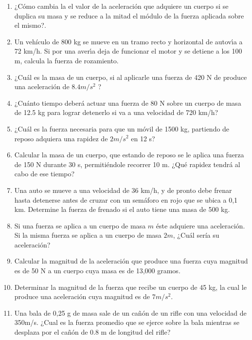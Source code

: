 \documentclass[a5paper,pagesize,10pt,bibtotoc,pointlessnumbers,
normalheadings,DIV=9,fleqn,x11names,table,twoside=false]{scrbook}
\begin{document}
\begin{enumerate}
\item ¿Cómo cambia la el valor de la aceleración que adquiere un cuerpo si se duplica su masa y se reduce a la mitad el módulo de 
la fuerza aplicada sobre el mismo?.

\item Un vehículo de 800 kg se mueve en un tramo recto y horizontal de autovı́a a 72 km/h. Si por una averı́a deja de funcionar 
el motor y se detiene a los 100 m, calcula la fuerza de rozamiento.

\item ¿Cuál es la masa de un cuerpo, si al aplicarle una fuerza de 420 N de produce una aceleración de $8.4 m/s^2$ ?

\item ¿Cuánto tiempo deberá actuar una fuerza de 80 N sobre un cuerpo de masa de 12.5 kg para lograr detenerlo si va a una 
velocidad de 720 km/h?

\item ¿Cuál es la fuerza necesaria para que un móvil de 1500 kg, partiendo de reposo adquiera una rapidez de $2 m/s^2$ en 12 s?

\item Calcular la masa de un cuerpo, que estando de reposo se le aplica una fuerza de 150 N durante 30 s, permitiéndole recorrer 
10 m. ¿Qué rapidez tendrá al cabo de ese tiempo?

\item  Una auto se mueve a una 
velocidad de 36 km/h, y de pronto debe frenar hasta detenerse antes de cruzar con un semáforo en 
rojo que se ubica a 0,1 km. Determine la fuerza de frenado si el auto tiene una masa de 500 kg.

\item  Si una fuerza se aplica a un 
cuerpo de masa $m$ éste adquiere una aceleración. Si la misma fuerza se aplica a un cuerpo 
de 
masa $2m$, ¿Cuál sería su aceleración?

\item Calcular la magnitud de la aceleración que produce una fuerza cuya magnitud es de 50 N a un cuerpo cuya masa es de 13,000 
gramos.

\item Determinar la magnitud de la fuerza que recibe un cuerpo de 45 kg, la cual le produce una aceleración cuya magnitud es de $7 
m/s^2$.

\item Una bala de 0,25 g de masa sale de un cañón de un rifle con una velocidad de 350m/s. ¿Cual es la fuerza promedio que se 
ejerce sobre la bala mientras se desplaza por el cañón de 0.8 m de longitud del rifle?


\end{enumerate}
\end{document}
